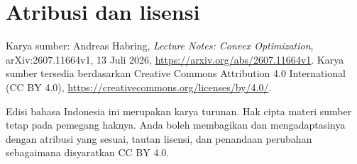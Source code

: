 \documentclass[indonesian]{shinybook}
\begin{document}
\printbibliography

\chapter*{Atribusi dan lisensi}
Karya sumber: Andreas Habring, \emph{Lecture Notes: Convex Optimization}, arXiv:2607.11664v1, 13 Juli 2026, \url{https://arxiv.org/abs/2607.11664v1}. Karya sumber tersedia berdasarkan Creative Commons Attribution 4.0 International (CC BY 4.0), \url{https://creativecommons.org/licenses/by/4.0/}.

Edisi bahasa Indonesia ini merupakan karya turunan. Hak cipta materi sumber tetap pada pemegang haknya. Anda boleh membagikan dan mengadaptasinya dengan atribusi yang sesuai, tautan lisensi, dan penandaan perubahan sebagaimana disyaratkan CC BY 4.0.
\end{document}
